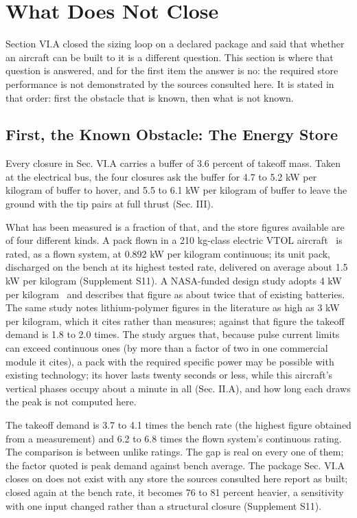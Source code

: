 \documentclass[journal]{new-aiaa}
\begin{document}
\section{What Does Not Close}

Section VI.A closed the sizing loop on a declared package and said that whether an aircraft can be built to it is a different question. This section is where that question is answered, and for the first item the answer is no: the required store performance is not demonstrated by the sources consulted here. It is stated in that order: first the obstacle that is known, then what is not known.

\subsection{First, the Known Obstacle: The Energy Store}

Every closure in Sec. VI.A carries a buffer of 3.6 percent of takeoff mass. Taken at the electrical bus, the four closures ask the buffer for 4.7 to 5.2 kW per kilogram of buffer to hover, and 5.5 to 6.1 kW per kilogram of buffer to leave the ground with the tip pairs at full thrust (Sec. III).

What has been measured is a fraction of that, and the store figures available are of four different kinds. A pack flown in a 210 kg-class electric VTOL aircraft~\cite{r25} is rated, as a flown system, at 0.892 kW per kilogram continuous; its unit pack, discharged on the bench at its highest tested rate, delivered on average about 1.5 kW per kilogram (Supplement S11). A NASA-funded design study adopts 4 kW per kilogram~\cite{r26} and describes that figure as about twice that of existing batteries. The same study notes lithium-polymer figures in the literature as high as 3 kW per kilogram, which it cites rather than measures; against that figure the takeoff demand is 1.8 to 2.0 times. The study argues that, because pulse current limits can exceed continuous ones (by more than a factor of two in one commercial module it cites), a pack with the required specific power may be possible with existing technology; its hover lasts twenty seconds or less, while this aircraft's vertical phases occupy about a minute in all (Sec. II.A), and how long each draws the peak is not computed here.

The takeoff demand is 3.7 to 4.1 times the bench rate (the highest figure obtained from a measurement) and 6.2 to 6.8 times the flown system's continuous rating. The comparison is between unlike ratings. The gap is real on every one of them; the factor quoted is peak demand against bench average. The package Sec. VI.A closes on does not exist with any store the sources consulted here report as built; closed again at the bench rate, it becomes 76 to 81 percent heavier, a sensitivity with one input changed rather than a structural closure (Supplement S11).
\end{document}
